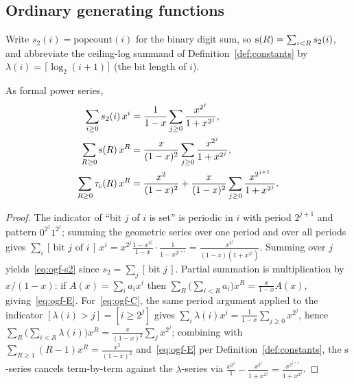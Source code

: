 \subsection{Ordinary generating functions}

Write $s_2(i) = \mathrm{popcount}(i)$ for the binary digit sum, so
$\mathrm{s}(R) = \sum_{i<R} s_2(i)$, and abbreviate the ceiling-log summand of
Definition~\ref{def:constants} by
$\lambda(i) = \lceil \log_2(i+1) \rceil$ (the bit length of $i$).

\begin{proposition}\label{prop:ogf}
	As formal power series,
	\begin{align}
		\sum_{i \ge 0} s_2(i)\, x^i
		 & = \frac{1}{1-x} \sum_{j \ge 0} \frac{x^{2^j}}{1+x^{2^j}},
		\label{eq:ogf-s2}                                             \\
		\sum_{R \ge 0} \mathrm{s}(R)\, x^R
		 & = \frac{x}{(1-x)^2} \sum_{j \ge 0} \frac{x^{2^j}}{1+x^{2^j}},
		\label{eq:ogf-E}                                              \\
		\sum_{R \ge 0} \tau_{\mathrm{c}}(R)\, x^R
		 & = \frac{x^2}{(1-x)^2}
		+ \frac{x}{(1-x)^2} \sum_{j \ge 0} \frac{x^{2^{j+1}}}{1+x^{2^j}}.
		\label{eq:ogf-C}
	\end{align}
\end{proposition}

\begin{proof}
	The indicator of ``bit $j$ of $i$ is set'' is periodic in $i$ with period
	$2^{j+1}$ and pattern $0^{2^j} 1^{2^j}$; summing the geometric series over
	one period and over all periods gives
	$\sum_i [\,\text{bit } j \text{ of } i\,]\, x^i
		= x^{2^j} \frac{1-x^{2^j}}{1-x} \cdot \frac{1}{1-x^{2^{j+1}}}
		= \frac{x^{2^j}}{(1-x)(1+x^{2^j})}$.
	Summing over $j$ yields~\eqref{eq:ogf-s2} since
	$s_2 = \sum_j [\,\text{bit } j\,]$. Partial summation is multiplication by
	$x/(1-x)$: if $A(x) = \sum_i a_i x^i$ then
	$\sum_R \big(\sum_{i<R} a_i\big) x^R = \frac{x}{1-x} A(x)$, giving~\eqref{eq:ogf-E}.
	For~\eqref{eq:ogf-C}, the same period argument applied to the indicator
	$[\lambda(i) > j] = [i \ge 2^j]$ gives
	$\sum_i \lambda(i) x^i = \frac{1}{1-x}\sum_{j\ge0} x^{2^j}$, hence
	$\sum_R \big(\sum_{i<R}\lambda(i)\big) x^R = \frac{x}{(1-x)^2}\sum_j x^{2^j}$;
	combining with $\sum_{R \ge 1} (R-1)x^R = \frac{x^2}{(1-x)^2}$
	and~\eqref{eq:ogf-E} per Definition~\ref{def:constants}, the
	$\mathrm{s}$-series cancels term-by-term against the $\lambda$-series via
	$\frac{x^{2^j}}{1} - \frac{x^{2^j}}{1+x^{2^j}} = \frac{x^{2^{j+1}}}{1+x^{2^j}}$.
\end{proof}

